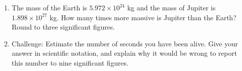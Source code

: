 \documentclass[12pt, twoside]{article}
\begin{document}
\begin{enumerate}[itemsep=0.4cm]
\item The mass of the Earth is $5.972 \times 10^{24}$ kg and the mass of Jupiter is $1.898 \times 10^{27}$ kg. How many times more massive is Jupiter than the Earth? Round to three significant figures. \vspace{2.5cm}

\item Challenge: Estimate the number of seconds you have been alive. Give your answer in scientific notation, and explain why it would be wrong to report this number to nine significant figures.

\end{enumerate}
\end{document}
